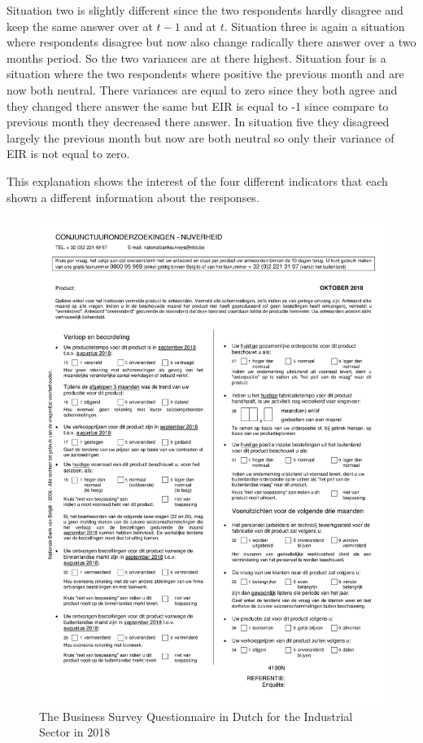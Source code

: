 \documentclass[12pt,a4paper,oneside]{book}
\begin{document}
Situation two is slightly different since the two respondents hardly disagree and keep the same answer over at $t-1$ and at $t$.
Situation three is again a situation where respondents disagree but now also change radically there answer over a two months period. So the two variances are at there highest.
Situation four is a situation where the two respondents where positive the previous month and are now both neutral. There variances are equal to zero since they both agree and they changed there answer the same but EIR is equal to -1 since compare to previous month they decreased there answer.
In situation five they disagreed largely the previous month but now are both neutral so only their variance of EIR is not equal to zero.

This explanation shows the interest of the four different indicators that each shown a different information about the responses.



\newpage
\begin{figure}[H]
    \centering
    \includegraphics[scale=0.75]{Images/IndustryN.pdf}
    \caption{The Business Survey Questionnaire in Dutch for the Industrial Sector in 2018}
    \label{Questionnaire2018}
\end{figure}
\end{document}
